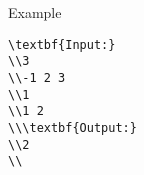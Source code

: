 Example
\begin{verbatim}
\textbf{Input:}
\\3
\\-1 2 3
\\1
\\1 2
\\\textbf{Output:}
\\2
\\\end{verbatim}